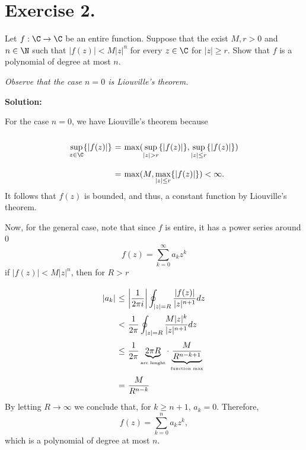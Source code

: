 \section*{Exercise 2.}

Let $f: \C \to \C$ be an entire function. Suppose that the exist $M, r> 0$ and $n\in \N$ such that $|f(z)|<M|z|^n$ for every $z\in\C$ for $|z|\geq r$. Show that $f$ is a polynomial of degree at most $n$.

\textit{Observe that the case $n = 0$ is Liouville's theorem.}

\textbf{Solution:}

For the case $n = 0$, we have Liouville's theorem because
\[ \everymath{\displaystyle}
\arraycolsep=1.8pt\def\arraystretch{2.5}
\begin{array}{rcl}
    \sup_{z\in\C}\{|f(z)|\} & = & \max(\sup_{|z| > r}\{|f(z)|\}, \sup_{|z| \leq r}\{|f(z)|\})\\
    & = & \max(M, \max_{|z| \leq r}\{|f(z)|\}) < \infty.
\end{array} \]
It follows that $f(z)$ is bounded, and thus, a constant function by Liouville's theorem. 

Now, for the general case, note that since $f$ is entire, it has a power series around 0
\[ f(z) = \sum_{k = 0}^{\infty} a_k z^k \]
if $|f(z)| < M |z|^n$, then for $R > r$
\[ \everymath{\displaystyle}
\arraycolsep=1.8pt\def\arraystretch{2.5}
\begin{array}{rcl}
    |a_k| & \leq & \left| \frac{1}{2\pi i} \right| \oint_{|z| = R} \frac{|f(z)|}{|z|^{n+1}} dz\\
    & < & \frac{1}{2\pi} \oint_{|z| = R} \frac{M|z|^k}{|z|^{n+1}} dz\\
    & \leq & \frac{1}{2\pi } \underbrace{2\pi R}_{\mbox{\tiny{arc lenght}}} \cdot \underbrace{\frac{M}{R^{n-k+1}}}_{\mbox{\tiny{function max}}}\\
    & = & \frac{M}{R^{n-k}}
\end{array} \]
By letting $R \to \infty$ we conclude that, for $k \geq n+1$, $a_k = 0$. Therefore,
\[ f(z) = \sum_{k = 0}^{n} a_k z^k, \]
which is a polynomial of degree at most $n$.
